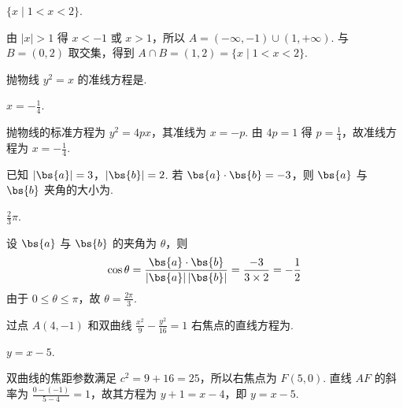 \begin{answer}
\(\{x\mid 1<x<2\}\).
\end{answer}

\begin{solution}
由 \(|x|>1\) 得 \(x<-1\) 或 \(x>1\)，所以 \(A=(-\infty,-1)\cup(1,+\infty)\). 与 \(B=(0,2)\) 取交集，得到 \(A\cap B=(1,2)=\{x\mid1<x<2\}\).
\end{solution}

\begin{problem}

抛物线 \( y^{2}=x \) 的准线方程是\fillinblank{}.
\end{problem}

\begin{answer}
\(x=-\frac14\).
\end{answer}

\begin{solution}
抛物线的标准方程为 \(y^2=4px\)，其准线为 \(x=-p\). 由 \(4p=1\) 得 \(p=\frac14\)，故准线方程为 \(x=-\frac14\).
\end{solution}

\begin{problem}

已知 \(\left|\bs{a}\right|=3\)，\(\left|\bs{b}\right|=2\). 若 \(\bs{a}\cdot\bs{b}=-3\)，则 \(\bs{a}\) 与 \(\bs{b}\) 夹角的大小为\fillinblank{}.
\end{problem}

\begin{answer}
\(\frac{2}{3}\pi\).
\end{answer}

\begin{solution}
设 \(\bs{a}\) 与 \(\bs{b}\) 的夹角为 \(\theta\)，则
\[
\cos\theta=\frac{\bs{a}\cdot\bs{b}}{\left|\bs{a}\right|\left|\bs{b}\right|}=\frac{-3}{3\times2}=-\frac12
\]
由于 \(0\leqslant\theta\leqslant\pi\)，故 \(\theta=\frac{2\pi}{3}\).
\end{solution}

\begin{problem}

过点 \( A(4, -1) \) 和双曲线 \( \frac{x^{2}}{9} - \frac{y^{2}}{16} = 1 \) 右焦点的直线方程为\fillinblank{}.
\end{problem}

\begin{answer}
\(y=x-5\).
\end{answer}

\begin{solution}
双曲线的焦距参数满足 \(c^2=9+16=25\)，所以右焦点为 \(F(5,0)\). 直线 \(AF\) 的斜率为 \(\frac{0-(-1)}{5-4}=1\)，故其方程为 \(y+1=x-4\)，即 \(y=x-5\).
\end{solution}

